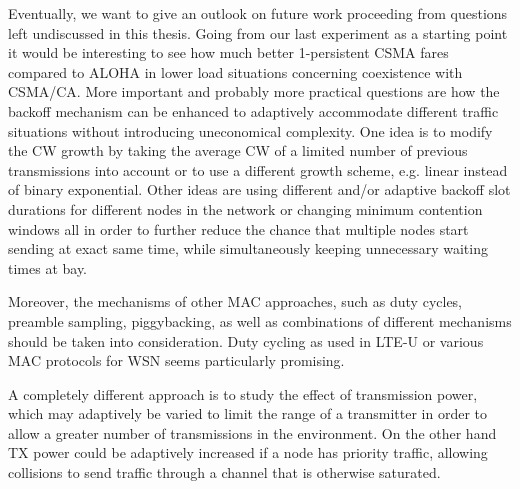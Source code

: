 Eventually, we want to give an outlook on future work proceeding from questions left undiscussed in this thesis. Going from our last experiment as a starting point it would be interesting to see how much better 1-persistent CSMA fares compared to ALOHA in lower load situations concerning coexistence with CSMA/CA. More important and probably more practical questions are how the backoff mechanism can be enhanced to adaptively accommodate different traffic situations without introducing uneconomical complexity. One idea is to modify the CW growth by taking the average CW of a limited number of previous transmissions into account or to use a different growth scheme, e.g. linear instead of binary exponential. Other ideas are using different and/or adaptive backoff slot durations for different nodes in the network or changing minimum contention windows all in order to further reduce the chance that multiple nodes start sending at exact same time, while simultaneously keeping unnecessary waiting times at bay. 

Moreover, the mechanisms of other MAC approaches, such as duty cycles, preamble sampling, piggybacking, as well as combinations of different mechanisms should be taken into consideration. Duty cycling as used in LTE-U or various MAC protocols for WSN seems particularly promising. 

A completely different approach is to study the effect of transmission power, which may adaptively be varied to limit the range of a transmitter in order to allow a greater number of transmissions in the environment. On the other hand TX power could be adaptively increased if a node has priority traffic, allowing collisions to send traffic through a channel that is otherwise saturated. 
